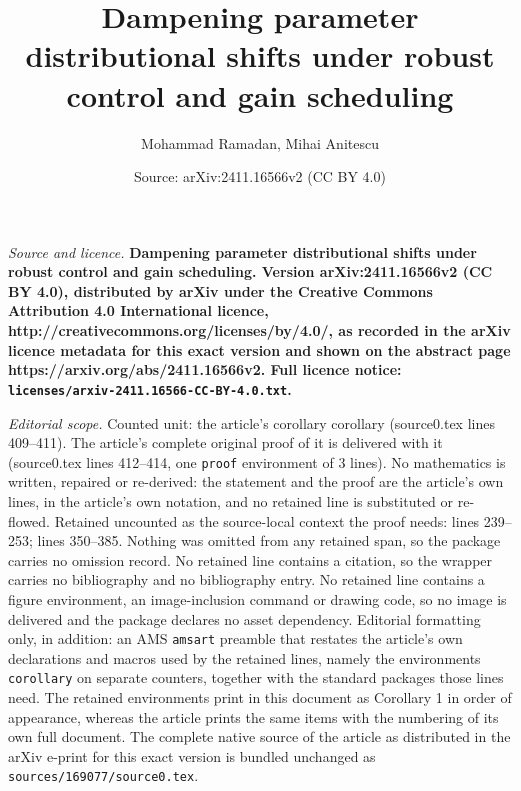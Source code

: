 \documentclass[10pt,a4paper]{amsart}
\title{\Large \bf Dampening parameter distributional shifts under robust control and gain scheduling}
\author{Mohammad Ramadan, Mihai Anitescu}
\date{Source: arXiv:2411.16566v2 (CC BY 4.0)}
\begin{document}
\maketitle

\noindent\emph{Source and licence.} \Large \bf Dampening parameter distributional shifts under robust control and gain scheduling. Version arXiv:2411.16566v2 (CC BY 4.0), distributed by arXiv under the Creative Commons Attribution 4.0 International licence, http://creativecommons.org/licenses/by/4.0/, as recorded in the arXiv licence metadata for this exact version and shown on the abstract page https://arxiv.org/abs/2411.16566v2. Full licence notice: \texttt{licenses/arxiv-2411.16566-CC-BY-4.0.txt}.\par\smallskip

\noindent\textit{Editorial scope.} Counted unit: the article's corollary corollary (source0.tex lines 409--411). The article's complete original proof of it is delivered with it (source0.tex lines 412--414, one \texttt{proof} environment of 3 lines). No mathematics is written, repaired or re-derived: the statement and the proof are the article's own lines, in the article's own notation, and no retained line is substituted or re-flowed.  Retained uncounted as the source-local context the proof needs: lines 239--253; lines 350--385.  Nothing was omitted from any retained span, so the package carries no omission record.  No retained line contains a citation, so the wrapper carries no bibliography and no bibliography entry.  No retained line contains a figure environment, an image-inclusion command or drawing code, so no image is delivered and the package declares no asset dependency.  Editorial formatting only, in addition: an AMS \texttt{amsart} preamble that restates the article's own declarations and macros used by the retained lines, namely the environments \texttt{corollary} on separate counters, together with the standard packages those lines need.  The retained environments print in this document as Corollary 1 in order of appearance, whereas the article prints the same items with the numbering of its own full document.  The complete native source of the article as distributed in the arXiv e-print for this exact version is bundled unchanged as \texttt{sources/169077/source0.tex}.
\end{document}

